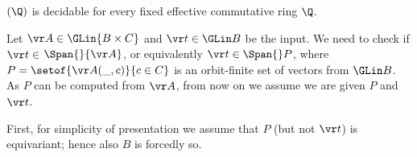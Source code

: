 \begin{theorem} \label{thm:fin-solv}
\finsolvname$(\Q)$ is decidable for every fixed effective commutative ring $\Q$.
\end{theorem} 




Let $\vr A \in \GLin{B \times C}$ and $\vr t\in\GLin B$ be the input.
We need to check if $\vr t \in$ $\Span {} {\vr A}$, or equivalently
$\vr t \in \Span {} P$, where $P = \setof{\vr A(\_, c)}{c\in C}$ is an orbit-finite set of vectors from $\GLin B$.
As $P$ can be computed from $\vr A$, 
from now on we assume we are given $P$ and $\vr t$.


First, for simplicity of presentation
we assume that $P$ (but not $\vr t$) is equivariant; hence also $B$ is forcedly so.
%
%
%
%
%
%
%
%

